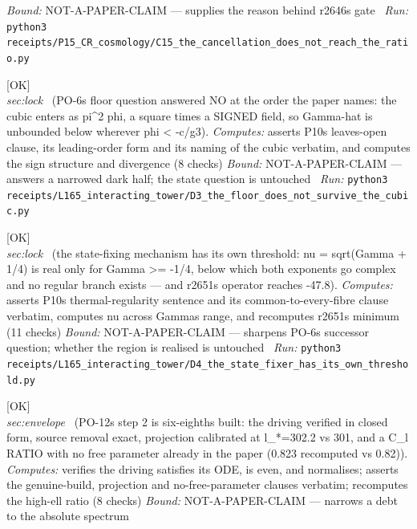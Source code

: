 \begin{description}
 \emph{Bound:} NOT-A-PAPER-CLAIM --- supplies the reason behind r2646s gate
\ \emph{Run:} \texttt{python3 receipts/P15\_CR\_cosmology/C15\_the\_cancellation\_does\_not\_reach\_the\_ratio.py}
\item[\label{rcpt:D3_the_floor_does_not_survive_the_cubic}\texttt{D3\_the\_floor\_does\_not\_survive\_the\_cubic}]\hfill\textsf{[OK]}\\
\textit{sec:lock} \ (PO-6s floor question answered NO at the order the paper names: the cubic enters as pi\textasciicircum{}2 phi, a square times a SIGNED field, so Gamma-hat is unbounded below wherever phi < -c/g3). 
\emph{Computes:} asserts P10s leaves-open clause, its leading-order form and its naming of the cubic verbatim, and computes the sign structure and divergence (8 checks)
 \emph{Bound:} NOT-A-PAPER-CLAIM --- answers a narrowed dark half; the state question is untouched
\ \emph{Run:} \texttt{python3 receipts/L165\_interacting\_tower/D3\_the\_floor\_does\_not\_survive\_the\_cubic.py}
\item[\label{rcpt:D4_the_state_fixer_has_its_own_threshold}\texttt{D4\_the\_state\_fixer\_has\_its\_own\_threshold}]\hfill\textsf{[OK]}\\
\textit{sec:lock} \ (the state-fixing mechanism has its own threshold: nu = sqrt(Gamma + 1/4) is real only for Gamma >= -1/4, below which both exponents go complex and no regular branch exists --- and r2651s operator reaches -47.8). 
\emph{Computes:} asserts P10s thermal-regularity sentence and its common-to-every-fibre clause verbatim, computes nu across Gammas range, and recomputes r2651s minimum (11 checks)
 \emph{Bound:} NOT-A-PAPER-CLAIM --- sharpens PO-6s successor question; whether the region is realised is untouched
\ \emph{Run:} \texttt{python3 receipts/L165\_interacting\_tower/D4\_the\_state\_fixer\_has\_its\_own\_threshold.py}
\item[\label{rcpt:C16_the_transfer_is_six_eighths_built}\texttt{C16\_the\_transfer\_is\_six\_eighths\_built}]\hfill\textsf{[OK]}\\
\textit{sec:envelope} \ (PO-12s step 2 is six-eighths built: the driving verified in closed form, source removal exact, projection calibrated at l\_*=302.2 vs 301, and a C\_l RATIO with no free parameter already in the paper (0.823 recomputed vs 0.82)). 
\emph{Computes:} verifies the driving satisfies its ODE, is even, and normalises; asserts the genuine-build, projection and no-free-parameter clauses verbatim; recomputes the high-ell ratio (8 checks)
 \emph{Bound:} NOT-A-PAPER-CLAIM --- narrows a debt to the absolute spectrum

\end{description}
